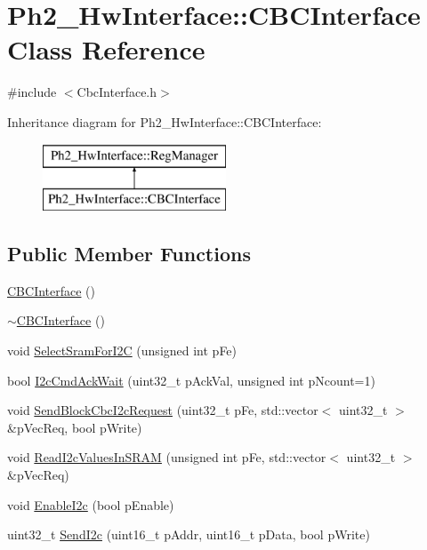 \hypertarget{class_ph2___hw_interface_1_1_c_b_c_interface}{\section{Ph2\-\_\-\-Hw\-Interface\-:\-:C\-B\-C\-Interface Class Reference}
\label{class_ph2___hw_interface_1_1_c_b_c_interface}
}


{\ttfamily \#include $<$Cbc\-Interface.\-h$>$}

Inheritance diagram for Ph2\-\_\-\-Hw\-Interface\-:\-:C\-B\-C\-Interface\-:\begin{figure}[H]
\begin{center}
\leavevmode
\includegraphics[height=2.000000cm]{class_ph2___hw_interface_1_1_c_b_c_interface}
\end{center}
\end{figure}
\subsection*{Public Member Functions}
\begin{DoxyCompactItemize}
\item 
\hyperlink{class_ph2___hw_interface_1_1_c_b_c_interface_ac6d2dce57f278cc0678c32ae432187e4}{C\-B\-C\-Interface} ()
\item 
\hyperlink{class_ph2___hw_interface_1_1_c_b_c_interface_a28d0a36d433bae296ff3980c80b3b1cd}{$\sim$\-C\-B\-C\-Interface} ()
\item 
void \hyperlink{class_ph2___hw_interface_1_1_c_b_c_interface_aecf7769a1863999fd05efca3993d3b92}{Select\-Sram\-For\-I2\-C} (unsigned int p\-Fe)
\item 
bool \hyperlink{class_ph2___hw_interface_1_1_c_b_c_interface_a8dff31d5f9575070179612b5b9335aa4}{I2c\-Cmd\-Ack\-Wait} (uint32\-\_\-t p\-Ack\-Val, unsigned int p\-Ncount=1)
\item 
void \hyperlink{class_ph2___hw_interface_1_1_c_b_c_interface_af6eeb7700b550a51acca3441180ddc33}{Send\-Block\-Cbc\-I2c\-Request} (uint32\-\_\-t p\-Fe, std\-::vector$<$ uint32\-\_\-t $>$ \&p\-Vec\-Req, bool p\-Write)
\item 
void \hyperlink{class_ph2___hw_interface_1_1_c_b_c_interface_a07b718e617fb6e992764c724edd4d406}{Read\-I2c\-Values\-In\-S\-R\-A\-M} (unsigned int p\-Fe, std\-::vector$<$ uint32\-\_\-t $>$ \&p\-Vec\-Req)
\item 
void \hyperlink{class_ph2___hw_interface_1_1_c_b_c_interface_ad79c9b9ec21e78d35fd0c62e48ba6784}{Enable\-I2c} (bool p\-Enable)
\item 
uint32\-\_\-t \hyperlink{class_ph2___hw_interface_1_1_c_b_c_interface_a9c34bda282edef6fec34245969ac59a0}{Send\-I2c} (uint16\-\_\-t p\-Addr, uint16\-\_\-t p\-Data, bool p\-Write)
\end{DoxyCompactItemize}
